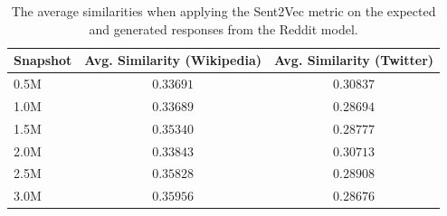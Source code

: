 \begin{table}[H]
	\centering
	\begin{adjustbox}{max width=\textwidth}
		\begin{tabular}{lcc}
			\toprule
			Snapshot & Avg. Similarity (Wikipedia) & Avg. Similarity (Twitter)\\
			\midrule
			0.5M & $0.33691$ & $0.30837$\\
			1.0M & $0.33689$ & $0.28694$\\
			1.5M & $0.35340$ & $0.28777$\\
			2.0M & $0.33843$ & $0.30713$\\
			2.5M & $0.35828$ & $0.28908$\\
			3.0M & $0.35956$ & $0.28676$\\
			\bottomrule
		\end{tabular}
	\end{adjustbox}
	\caption{The average similarities when applying the Sent2Vec metric on the expected and generated responses from the Reddit model.}
	\label{results:sent2vec:reddit:results_table}
\end{table}


